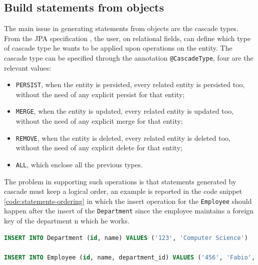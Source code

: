 \subsection{Build statements from objects}
The main issue in generating statements from objects are the cascade types. From the JPA specification \cite{book:projpa2}, the user, on relational fields, can define which type of cascade type he wants to be applied upon operations on the entity. The cascade type can be specified through the annotation \texttt{@CascadeType}, four are the relevant values:
\begin{itemize}
\item \texttt{PERSIST}, when the entity is persisted, every related entity is persisted too, without the need of any explicit persist for that entity;
\item \texttt{MERGE}, when the entity is updated, every related entity is updated too, without the need of any explicit merge for that entity;
\item \texttt{REMOVE}, when the entity is deleted, every related entity is deleted too, without the need of any explicit delete for that entity;
\item \texttt{ALL}, which enclose all the previous types.
\end{itemize}

\noindent The problem in supporting such operations is that statements generated by cascade must keep a logical order, an example is reported in the code snippet \ref{code:statements-ordering} in which the insert operation for the \texttt{Employee} should happen after the insert of the \texttt{Department} since the employee maintains a foreign key of the department n which he works.

\begin{lstlisting}[language=SQL, caption=Insert statements ordering example, label=code:statements-ordering]
INSERT INTO Department (id, name) VALUES ('123', 'Computer Science')

INSERT INTO Employee (id, name, department_id) VALUES ('456', 'Fabio', '123')
\end{lstlisting}

